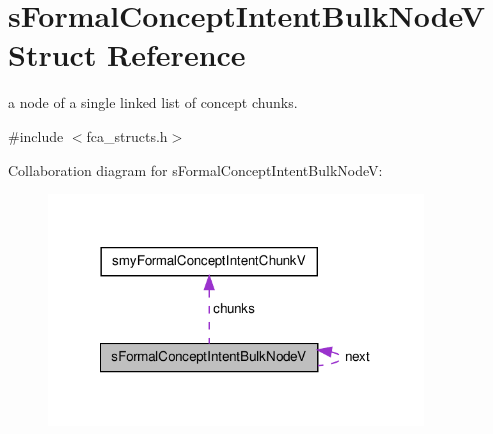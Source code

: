 \hypertarget{structsFormalConceptIntentBulkNodeV}{\section{s\-Formal\-Concept\-Intent\-Bulk\-Node\-V \-Struct \-Reference}
\label{structsFormalConceptIntentBulkNodeV}
}


a node of a single linked list of concept chunks.  




{\ttfamily \#include $<$fca\-\_\-structs.\-h$>$}



\-Collaboration diagram for s\-Formal\-Concept\-Intent\-Bulk\-Node\-V\-:\nopagebreak
\begin{figure}[H]
\begin{center}
\leavevmode
\includegraphics[width=282pt]{structsFormalConceptIntentBulkNodeV__coll__graph}
\end{center}
\end{figure}
